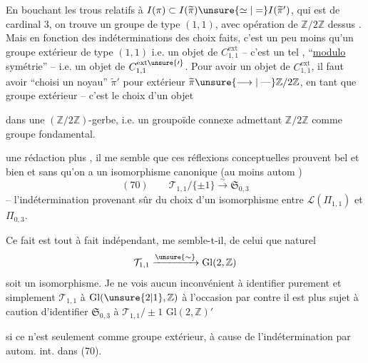 En bouchant les trous relatifs à $I(\pi)\subset I(\widetilde{\pi})\unsure{\simeq|=}I(\widetilde{\pi}')$, qui est de cardinal $3$, on trouve un groupe  de type $(1,1)$, avec opération de $\mathbb Z/2\mathbb Z$ dessus . Mais en fonction des indéterminations des choix faits, c'est un peu moins qu'un groupe extérieur de type $(1,1)$ i.e. un objet de $C^{\mathrm{ext}}_{1,1}$ -- c'est un tel , ``\uline{modulo} symétrie'' -- i.e. un objet de $C^{\mathrm{ext}\unsure{\prime}}_{1,1}$. Pour avoir un objet de $C^{\mathrm{ext}}_{1,1}$, il faut avoir ``choisi un noyau'' $\widetilde{\pi}'$ pour  extérieur $\widetilde{\pi}\unsure{\longrightarrow|\mathrel{\text{---}}}\mathbb Z/2\mathbb Z$, en tant que groupe extérieur -- c'est le choix d'un objet


dans une $(\mathbb Z/2\mathbb Z)$-gerbe, i.e.  un groupoïde connexe admettant $\mathbb Z/2\mathbb Z$ comme groupe fondamental.

 une rédaction plus , il me semble que ces réflexions conceptuelles prouvent bel et bien et sans  qu'on a un isomorphisme canonique (au moins  autom )
\[
(70)\qquad \mathcal T_{1,1}/\{\pm1\}\xrightarrow{\sim}\mathfrak S_{0,3}
\]
-- l'indétermination  provenant  sûr du choix d'un isomorphisme entre $\mathcal L(\Pi_{1,1})$ et $\Pi_{0,3}$.

Ce fait est tout à fait indépendant,  me semble-t-il, de celui que  naturel
\[
\mathcal T_{1,1}\xrightarrow{\unsure{\sim}}\mathrm{Gl}(2,\mathbb Z)
\]
soit un isomorphisme. Je ne vois aucun inconvénient à identifier purement et simplement $\mathcal T_{1,1}$ à $\mathrm{Gl}(\unsure{2|1},\mathbb Z)$ à l'occasion\unsure{,|;} par contre il est plus sujet à caution d'identifier $\mathfrak S_{0,3}$ à $\mathcal T_{1,1}/\pm1$  $\mathrm{Gl}(2,\mathbb Z)'$


si ce n'est seulement comme groupe extérieur, à cause de l'indétermination par autom. int. dans (70).

